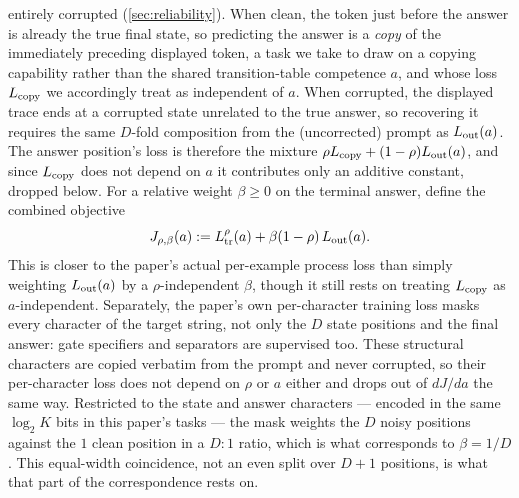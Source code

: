 entirely corrupted (\cref{sec:reliability}). When clean, the token just
before the answer is already the true final state, so predicting the
answer is a \emph{copy} of the immediately preceding displayed token, a
task we take to draw on a copying capability rather than the shared
transition-table competence $a$, and whose loss $L_{\rm copy}$ we
accordingly treat as independent of $a$. When corrupted, the displayed
trace ends at a corrupted state unrelated to the true answer, so recovering
it requires the same $D$-fold composition from the (uncorrected) prompt as
$L_{\rm out}(a)$. The answer position's loss is therefore the mixture
$\rho L_{\rm copy}+(1-\rho)L_{\rm out}(a)$, and since $L_{\rm copy}$ does not
depend on $a$ it contributes only an additive constant, dropped below. For a
relative weight $\beta\ge0$ on the terminal answer, define the combined
objective
\begin{equation}
 J_{\rho,\beta}(a) := L^\rho_{\rm tr}(a) + \beta(1-\rho)\, L_{\rm out}(a).
 \label{eq:combined-loss}
\end{equation}
This is closer to the paper's actual per-example process loss than simply
weighting $L_{\rm out}(a)$ by a $\rho$-independent $\beta$, though it still
rests on treating $L_{\rm copy}$ as $a$-independent. Separately, the
paper's own per-character training loss masks every character of the
target string, not only the $D$ state positions and the final answer: gate
specifiers and separators are supervised too. These structural characters
are copied verbatim from the prompt and never corrupted, so their
per-character loss does not depend on $\rho$ or $a$ either and drops out of
$dJ/da$ the same way. Restricted to the state and answer characters ---
encoded in the same $\log_2K$ bits in this paper's tasks --- the mask
weights the $D$ noisy positions against the $1$ clean position in a $D:1$
ratio, which is what corresponds to $\beta=1/D$. This equal-width
coincidence, not an even split over $D+1$ positions, is what that part of
the correspondence rests on.


